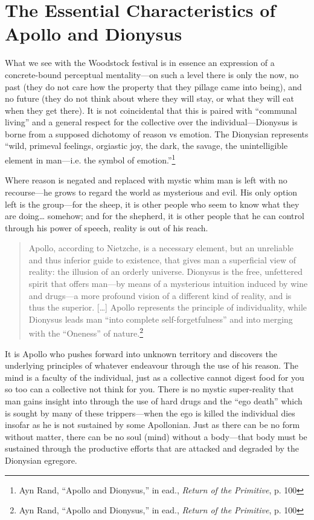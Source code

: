 \documentclass[11pt]{article}
\begin{document}
\section{The Essential Characteristics of Apollo and Dionysus}
\label{sec:org7201a1a}
What we see with the Woodstock festival is in essence an expression of a concrete-bound perceptual mentality---on such a level there is only the now, no past (they do not care how the property that they pillage came into being), and no future (they do not think about where they will stay, or what they will eat when they get there). It is not coincidental that this is paired with ``communal living'' and a general respect for the collective over the individual---Dionysus is borne from a supposed dichotomy of reason vs emotion. The Dionysian represents ``wild, primeval feelings, orgiastic joy, the dark, the savage, the unintelligible element in man---i.e. the symbol of emotion.''\footnote{Ayn Rand, ``Apollo and Dionysus,'' in ead., \emph{Return of the Primitive}, p. 100}

Where reason is negated and replaced with mystic whim man is left with no recourse---he grows to regard the world as mysterious and evil. His only option left is the group---for the sheep, it is other people who seem to know what they are doing\ldots{} somehow; and for the shepherd, it is other people that he can control through his power of speech, reality is out of his reach.

\begin{quote}
Apollo, according to Nietzche, is a necessary element, but an unreliable and thus inferior guide to existence, that gives man a superficial view of reality: the illusion of an orderly universe. Dionysus is the free, unfettered spirit that offers man---by means of a mysterious intuition induced by wine and drugs---a more profound vision of a different kind of reality, and is thus the superior. [\ldots{}] Apollo represents the principle of individuality, while Dionysus leads man ``into complete self-forgetfulness'' and into merging with the ``Oneness'' of nature.\footnote{Ayn Rand, ``Apollo and Dionysus,'' in ead., \emph{Return of the Primitive}, p. 100}
\end{quote}

It is Apollo who pushes forward into unknown territory and discovers the underlying principles of whatever endeavour through the use of his reason. The mind is a faculty of the individual, just as a collective cannot digest food for you so too can a collective not think for you. There is no mystic super-reality that man gains insight into through the use of hard drugs and the ``ego death'' which is sought by many of these trippers---when the ego is killed the individual dies insofar as he is not sustained by some Apollonian. Just as there can be no form without matter, there can be no soul (mind) without a body---that body must be sustained through the productive efforts that are attacked and degraded by the Dionysian egregore.
\end{document}
